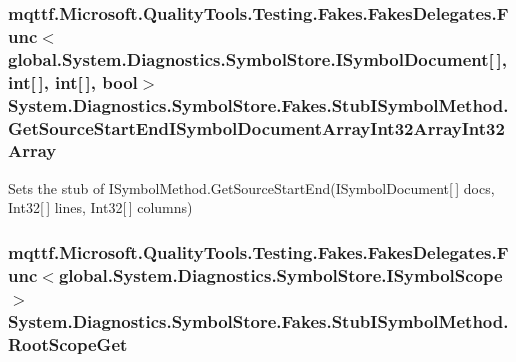 \hypertarget{class_system_1_1_diagnostics_1_1_symbol_store_1_1_fakes_1_1_stub_i_symbol_method_af8e9fa3fe274ae98f7332b945510ef47}{
\subsubsection[{Get\-Source\-Start\-End\-I\-Symbol\-Document\-Array\-Int32\-Array\-Int32\-Array}]{\setlength{\rightskip}{0pt plus 5cm}mqttf.\-Microsoft.\-Quality\-Tools.\-Testing.\-Fakes.\-Fakes\-Delegates.\-Func$<$global.\-System.\-Diagnostics.\-Symbol\-Store.\-I\-Symbol\-Document\mbox{[}$\,$\mbox{]}, int\mbox{[}$\,$\mbox{]}, int\mbox{[}$\,$\mbox{]}, bool$>$ System.\-Diagnostics.\-Symbol\-Store.\-Fakes.\-Stub\-I\-Symbol\-Method.\-Get\-Source\-Start\-End\-I\-Symbol\-Document\-Array\-Int32\-Array\-Int32\-Array}}\label{class_system_1_1_diagnostics_1_1_symbol_store_1_1_fakes_1_1_stub_i_symbol_method_af8e9fa3fe274ae98f7332b945510ef47}


Sets the stub of I\-Symbol\-Method.\-Get\-Source\-Start\-End(\-I\-Symbol\-Document\mbox{[}$\,$\mbox{]} docs, Int32\mbox{[}$\,$\mbox{]} lines, Int32\mbox{[}$\,$\mbox{]} columns)

\hypertarget{class_system_1_1_diagnostics_1_1_symbol_store_1_1_fakes_1_1_stub_i_symbol_method_a1ca217d4ef914c2881d087be4e0a3a67}{
\subsubsection[{Root\-Scope\-Get}]{\setlength{\rightskip}{0pt plus 5cm}mqttf.\-Microsoft.\-Quality\-Tools.\-Testing.\-Fakes.\-Fakes\-Delegates.\-Func$<$global.\-System.\-Diagnostics.\-Symbol\-Store.\-I\-Symbol\-Scope$>$ System.\-Diagnostics.\-Symbol\-Store.\-Fakes.\-Stub\-I\-Symbol\-Method.\-Root\-Scope\-Get}}\label{class_system_1_1_diagnostics_1_1_symbol_store_1_1_fakes_1_1_stub_i_symbol_method_a1ca217d4ef914c2881d087be4e0a3a67}


